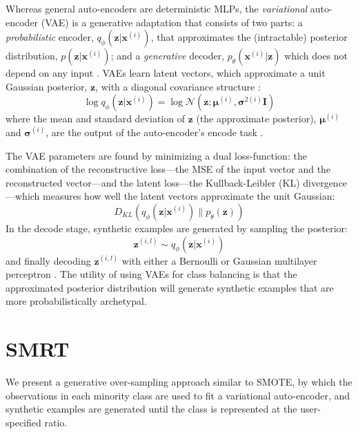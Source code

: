 \documentclass[twoside,11pt]{article}
\begin{document}
Whereas general auto-encoders are deterministic MLPs, the \emph{variational} auto-encoder (VAE) is a generative adaptation that consists of two parts: a \emph{probabilistic} encoder, $q_{\phi}(\mathbf{z}|\mathbf{x}^{(i)})$, that approximates the (intractable) posterior distribution, $p(\mathbf{z}|\mathbf{x}^{(i)})$; and a \emph{generative} decoder, $p_{\theta}(\mathbf{x}^{(i)}|\mathbf{z})$ which does not depend on any input \citep{shiffman2016}. VAEs learn latent vectors, which approximate a unit Gaussian posterior, $\mathbf{z}$, with a diagonal covariance structure \citep{kingma2013auto}:
\[
    \log q_{\phi}(\mathbf{z}|\mathbf{x}^{(i)}) = \log \mathcal{N}(\mathbf{z}; \bm{\mu}^{(i)}, \bm{\sigma}^{2(i)}\mathbf{I})
\]
where the mean and standard deviation of $\mathbf{z}$ (the approximate posterior), $\bm{\mu}^{(i)}$ and $\bm{\sigma}^{(i)}$, are the output of the auto-encoder's encode task \citep{kingma2013auto}.

The VAE parameters are found by minimizing a dual loss-function: the combination of the reconstructive loss---the MSE of the input vector and the reconstructed vector---and the latent loss---the Kullback-Leibler (KL) divergence---which measures how well the latent vectors approximate the unit Gaussian:
\[
    D_{KL}(q_{\phi}(\mathbf{z}|\mathbf{x}^{(i)})\parallel p_{\theta}(\mathbf{z}))
\]
In the decode stage, synthetic examples are generated by sampling the posterior:
\[
    \mathbf{z}^{(i,l)} \sim q_{\phi}(\mathbf{z}|\mathbf{x}^{(i)})
\]
and finally decoding $\mathbf{z}^{(i,l)}$ with either a Bernoulli or Gaussian multilayer perceptron \citep{kingma2013auto}. The utility of using VAEs for class balancing is that the approximated posterior distribution will generate synthetic examples that are more probabilistically archetypal.


\section{SMRT}

We present a generative over-sampling approach similar to SMOTE, by which the observations in each minority class are used to fit a variational auto-encoder, and synthetic examples are generated until the class is represented at the user-specified ratio. \\

\makeatletter
\def\BState{\State\hskip-\ALG@thistlm}
\makeatother
\end{document}
